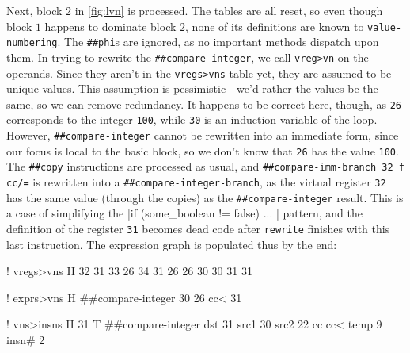 Next, block $2$ in \vref{fig:lvn} is processed.  The tables are all reset, so
even though block $1$ happens to dominate block $2$,
none of its definitions are known to \Verb|value-numbering|.  The
\Verb|##phi|s are ignored, as no important methods dispatch upon them.  In
trying to rewrite the \Verb|##compare-integer|, we call \Verb|vreg>vn| on
the operands.  Since they aren't in the \Verb|vregs>vns| table yet, they are
assumed to be unique values.  This assumption is pessimistic---we'd rather the
values be the same, so we can remove redundancy.  It happens to be correct
here, though, as \Verb|26| corresponds to the integer \Verb|100|, while
\Verb|30| is an induction variable of the loop.  However,
\Verb|##compare-integer| cannot be rewritten into an immediate form, since
our focus is local to the basic block, so we don't know that \Verb|26| has
the value \Verb|100|.  The \Verb|##copy| instructions are processed as
usual, and
%
\Verb|##compare-imm-branch 32 f cc/=|
%
is rewritten into a \Verb|##compare-integer-branch|, as the virtual register
\Verb|32| has the same value (through the copies) as the
\Verb|##compare-integer| result.  This is a case of simplifying the 
%
|if (some_boolean != false) { ... }|
%
pattern, and the definition of the register \Verb|31| becomes dead code after
\Verb|rewrite| finishes with this last instruction.  The expression graph is
populated thus by the end:
%
  \begin{factorcode}
    ! vregs>vns
    H{
        { 32 31 }
        { 33 26 }
        { 34 31 }
        { 26 26 }
        { 30 30 }
        { 31 31 }
    }

    ! exprs>vns
    H{ { { ##compare-integer 30 26 cc< } 31 } }

    ! vns>insns
    H{
        {
            31
            T{ ##compare-integer
                { dst 31 }
                { src1 30 }
                { src2 22 }
                { cc cc< }
                { temp 9 }
                { insn# 2 }
            }
        }
    }
  \end{factorcode}


